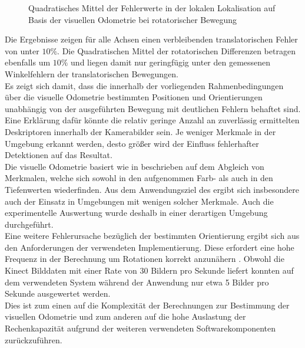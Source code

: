 \begin{figure}

\caption{Quadratisches Mittel der Fehlerwerte in der lokalen Lokalisation auf Basis der visuellen Odometrie bei rotatorischer Bewegung}
\label{fig.loc_loc_rot_fovis}
\end{figure}


Die Ergebnisse zeigen für alle Achsen einen verbleibenden translatorischen Fehler von unter $10\%$. Die Quadratischen Mittel der rotatorischen Differenzen betragen ebenfalls um $10\%$ und liegen damit nur geringfügig unter den gemessenen Winkelfehlern der translatorischen Bewegungen.\\
Es zeigt sich damit, dass die innerhalb der vorliegenden Rahmenbedingungen über die visuelle Odometrie bestimmten Positionen und Orientierungen unabhängig von der ausgeführten Bewegung mit deutlichen Fehlern behaftet sind.\\

Eine Erklärung dafür könnte die relativ geringe Anzahl an zuverlässig ermittelten Deskriptoren innerhalb der Kamerabilder sein. Je weniger Merkmale in der Umgebung erkannt werden, desto größer wird der Einfluss fehlerhafter Detektionen auf das Resultat.\\
Die visuelle Odometrie basiert wie in  beschrieben auf dem Abgleich von Merkmalen, welche sich sowohl in den aufgenommen Farb- als auch in den Tiefenwerten wiederfinden. Aus dem Anwendungsziel des  ergibt sich insbesondere auch der Einsatz in Umgebungen mit wenigen solcher Merkmale. Auch die experimentelle Auswertung wurde deshalb in einer derartigen Umgebung durchgeführt.\\

Eine weitere Fehlerursache bezüglich der bestimmten Orientierung ergibt sich aus den Anforderungen der verwendeten Implementierung. Diese erfordert eine hohe Frequenz in der Berechnung um Rotationen korrekt anzunähern \cite{Fovis}. Obwohl die Kinect Bilddaten mit einer Rate von \SI{30}{} Bildern pro Sekunde liefert konnten auf dem verwendeten System während der Anwendung nur etwa \SI{5}{} Bilder pro Sekunde ausgewertet werden.\\
Dies ist zum einen auf die Komplexität der Berechnungen zur Bestimmung der visuellen Odometrie und zum anderen auf die hohe Auslastung der Rechenkapazität aufgrund der weiteren verwendeten Softwarekomponenten zurückzuführen.\\ 

